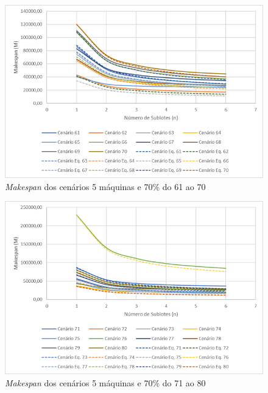 \begin{figure}[H]
    \centering
    \includegraphics[width=13cm]{Apendices/Figuras/05m70_61-70}
    \caption{\textit{Makespan} dos cenários 5 máquinas e 70\% do 61 ao 70}
    \label{fig:05m70_61-70}
\end{figure}

\begin{figure}[H]
    \centering
    \includegraphics[width=13cm]{Apendices/Figuras/05m70_71-80}
    \caption{\textit{Makespan} dos cenários 5 máquinas e 70\% do 71 ao 80}
    \label{fig:05m70_71-80}
\end{figure}

